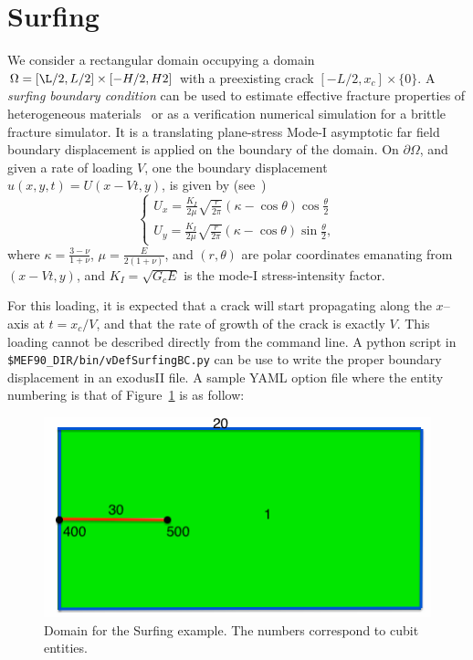 \documentclass[10pt,oneside]{memoir}
\begin{document}
\section{Surfing}
We consider a rectangular domain occupying a domain $\Omega = [\L/2,L/2] \times [-H/2,H2]$ with a preexisting crack $[-L/2,x_c] \times \{0\}$.
A \emph{surfing boundary condition} can be used to estimate effective fracture properties of heterogeneous materials~\cite{Hossein-Hsueh-EtAl-2014a} or as a verification numerical simulation for a brittle fracture simulator. 
It is a translating plane-stress Mode-I asymptotic far field boundary displacement is applied on the boundary of the domain. 
On $\partial \Omega$, and given a rate of loading $V$, one the boundary displacement $u(x,y,t) = U(x-Vt,y)$,  is given by (see~\cite{Zehnder-2012a})
\begin{equation}
\left\{
\begin{array}{l}
\displaystyle U_x = \frac{K_I}{2\mu}\sqrt{\frac{r}{2\pi}}(\kappa-\cos\theta)\cos{\frac{\theta}{2}}\\
\displaystyle U_y =\frac{K_I}{2\mu}\sqrt{\frac{r}{2\pi}}(\kappa-\cos\theta)\sin{\frac{\theta}{2}},
\end{array}
\right.
\end{equation}
where $\kappa = \frac{3-\nu}{1+\nu}$, $\mu = \frac{E}{2(1+\nu)}$, and $(r , \theta)$ are polar coordinates emanating from $(x-Vt,y)$, and $K_I = \sqrt{G_c E}$ is the mode-I stress-intensity factor.

For this loading, it is expected that a crack will start propagating along the $x$--axis at $t=x_c/V$, and that the rate of growth of the crack is exactly $V$.
This loading cannot be described directly from the command line. A python script in \verb+$MEF90_DIR/bin/vDefSurfingBC.py+ can be use to write the proper boundary displacement in an exodusII file. 
A sample YAML option file where the entity numbering is that of Figure~\ref{fig:Surfing} is as follow:
%

\begin{figure}[H]
\centering
\includegraphics[width=.45\textwidth]{Examples/Surfing/Geometry.png}
\caption{Domain for the Surfing example. The numbers correspond to cubit entities.}
\label{fig:Surfing}
\end{figure}
\end{document}

